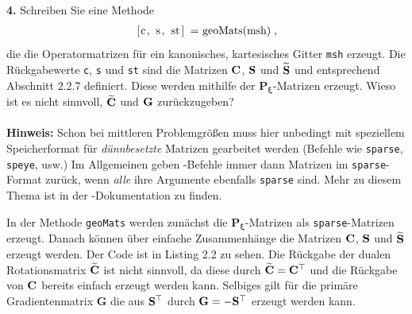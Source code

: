 \documentclass[Protokollheft.tex]{subfiles}
\begin{document}
        \begin{framed}
	\noindent \textbf{4.} Schreiben Sie eine Methode
                    \begin{align}
                        \lstinline{[c, s, st] = geoMats(msh)} \; ,
                    \end{align}
                    die die Operatormatrizen für ein kanonisches, kartesisches
                    Gitter \lstinline{msh} erzeugt. Die Rückgabewerte
                    \lstinline{c}, \lstinline{s} und \lstinline{st}
                    sind die Matrizen $\mathbf{C}$, $\mathbf{S}$ und $\widetilde{\mathbf{S}}$
                    und entsprechend Abschnitt 2.2.7 definiert. Diese werden mithilfe der
${\mathbf{P_\xi}}$-Matrizen erzeugt.
                    Wieso ist es nicht sinnvoll, $\widetilde{\mathbf{C}}$ und $\mathbf{G}$ zurückzugeben?\\
                    \ \\
                    {\textbf{Hinweis:}} Schon bei mittleren Problemgrößen muss hier
                    unbedingt mit  speziellem Speicherformat für
                    \emph{dünnbesetzte} Matrizen gearbeitet werden (Befehle wie
                    \lstinline{sparse}, \lstinline{speye}, usw.) Im Allgemeinen geben
                    \matlab-Befehle immer dann Matrizen im \lstinline{sparse}-Format
                    zurück, wenn \emph{alle} ihre Argumente ebenfalls \lstinline{sparse}
                    sind. Mehr zu diesem Thema ist in der \matlab-Dokumentation zu finden.\label{exer:geoMats}
\end{framed}
\noindent
In der Methode \lstinline{geoMats} werden zunächst die ${\mathbf{P_\xi}}$-Matrizen als \lstinline{sparse}-Matrizen erzeugt. Danach können über einfache Zusammenhänge die Matrizen $\mathbf{C}$, $\mathbf{S}$ und $\widetilde{\mathbf{S}}$ erzeugt werden. Der Code ist in Listing 2.2 zu sehen.
Die Rückgabe der dualen Rotationsmatrix $\widetilde{\mathbf{C}}$ ist nicht sinnvoll, da diese durch $\widetilde{\mathbf{C}} = \mathbf{C}^{\top}$ und die Rückgabe von $\mathbf{C}$ bereits einfach erzeugt werden kann. Selbiges gilt für die primäre Gradientenmatrix $\mathbf{G}$ die aus $\mathbf{S}^{\top}$ durch $\mathbf{G} = -\mathbf{S}^{\top}$ erzeugt werden kann.

 
\end{document}
